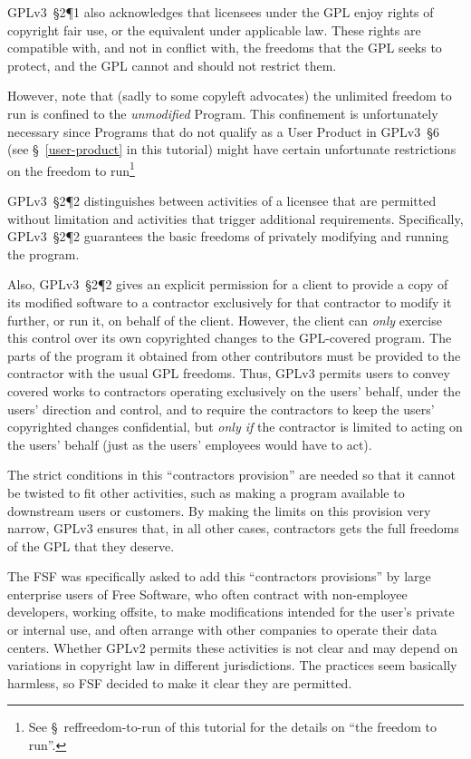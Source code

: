 GPLv3~\S2\P1 also acknowledges that licensees under the GPL enjoy rights of
copyright fair use, or the equivalent under applicable law.  These rights are
compatible with, and not in conflict with, the freedoms that the GPL seeks to
protect, and the GPL cannot and should not restrict them.

However, note that (sadly to some copyleft advocates) the unlimited freedom
to run is confined to the \textit{unmodified} Program.  This confinement is
unfortunately necessary since Programs that do not qualify as a User Product
in GPLv3~\S6 (see \S~\ref{user-product} in this tutorial) might have certain
unfortunate restrictions on the freedom to run\footnote{See
  \S~ref{freedom-to-run} of this tutorial for the details on ``the freedom to
  run''.}

GPLv3~\S2\P2 distinguishes between activities of a licensee that are
permitted without limitation and activities that trigger additional
requirements.  Specifically, GPLv3~\S2\P2 guarantees the basic freedoms of
privately modifying and running the program.

Also, GPLv3~\S2\P2 gives an explicit permission for a client to provide a
copy of its modified software to a contractor exclusively for that contractor
to modify it further, or run it, on behalf of the client.  However, the
client can \textit{only} exercise this control over its own copyrighted
changes to the GPL-covered program.  The parts of the program it obtained
from other contributors must be provided to the contractor with the usual GPL
freedoms.  Thus, GPLv3 permits users to convey covered works to contractors
operating exclusively on the users' behalf, under the users' direction and
control, and to require the contractors to keep the users' copyrighted
changes confidential, but \textit{only if} the contractor is limited to acting
on the users' behalf (just as the users' employees would have to act).

The strict conditions in this ``contractors provision'' are needed so that it
cannot be twisted to fit other activities, such as making a program available
to downstream users or customers.  By making the limits on this provision
very narrow, GPLv3 ensures that, in all other cases, contractors gets the
full freedoms of the GPL that they deserve.

The FSF was specifically asked to add this ``contractors provisions'' by
large enterprise users of Free Software, who often contract with non-employee
developers, working offsite, to make modifications intended for the user's
private or internal use, and often arrange with other companies to operate
their data centers.  Whether GPLv2 permits these activities is not clear and
may depend on variations in copyright law in different jurisdictions.  The
practices seem basically harmless, so FSF decided to make it clear they are
permitted.

